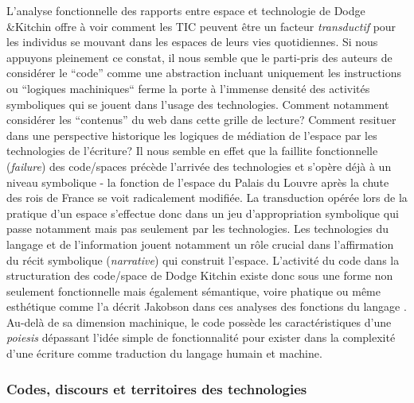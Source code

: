 L’analyse fonctionnelle des rapports entre espace et technologie de Dodge \&Kitchin offre à voir comment les TIC peuvent être un facteur \textit{transductif} pour les individus se mouvant dans les espaces de leurs vies quotidiennes. Si nous appuyons pleinement ce constat, il nous semble que le parti-pris des auteurs de considérer le “code” comme une abstraction incluant uniquement les instructions ou “logiques machiniques“ ferme la porte à l’immense densité des activités symboliques qui se jouent dans l’usage des technologies. Comment notamment considérer les “contenus” du web dans cette grille de lecture? Comment resituer dans une perspective historique les logiques de médiation de l’espace par les technologies de l’écriture? Il nous semble en effet que la faillite fonctionnelle (\textit{failure}) des code/spaces précède l’arrivée des technologies et s’opère déjà à un niveau symbolique - la fonction de l’espace du Palais du Louvre après la chute des rois de France se voit radicalement modifiée. La transduction opérée lors de la pratique d’un espace s’effectue donc dans un jeu d’appropriation symbolique qui passe notamment mais pas seulement par les technologies. Les technologies du langage et de l’information jouent notamment un rôle crucial dans l’affirmation du récit symbolique (\textit{narrative}) qui construit l’espace. L’activité du code dans la structuration des code/space de Dodge  Kitchin existe donc sous une forme non seulement fonctionnelle mais également sémantique, voire phatique ou même esthétique comme l’a décrit Jakobson dans ces analyses des fonctions du langage \citep{Jakobson1956}. Au-delà de sa dimension machinique, le code possède les caractéristiques d’une \textit{poiesis} dépassant l’idée simple de fonctionnalité pour exister dans la complexité d’une écriture comme traduction du langage humain et machine.

\subsubsection[Codes, discours et territoires des technologies]{Codes, discours et territoires des technologies}

